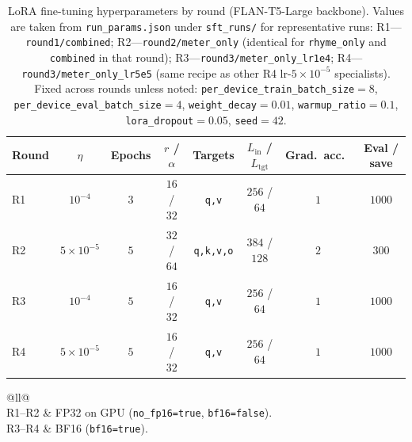 \begin{table}[t]
  \centering
  \small
  \caption{LoRA fine-tuning hyperparameters by round (FLAN-T5-Large backbone).
    Values are taken from \texttt{run\_params.json} under \texttt{sft\_runs/} for representative runs:
    R1---\texttt{round1/combined};
    R2---\texttt{round2/meter\_only} (identical for \texttt{rhyme\_only} and \texttt{combined} in that round);
    R3---\texttt{round3/meter\_only\_lr1e4};
    R4---\texttt{round3/meter\_only\_lr5e5} (same recipe as other R4 lr-$5{\times}10^{-5}$ specialists).
    Fixed across rounds unless noted: \texttt{per\_device\_train\_batch\_size}${}=8$, \texttt{per\_device\_eval\_batch\_size}${}=4$,
    \texttt{weight\_decay}${}=0.01$, \texttt{warmup\_ratio}${}=0.1$, \texttt{lora\_dropout}${}=0.05$, \texttt{seed}${}=42$.}
  \label{tab:lora-hyperparams-rounds}
  \begin{tabular}{@{}lccccccc@{}}
    \toprule
    Round
      & $\eta$
      & Epochs
      & $r$ / $\alpha$
      & Targets
      & $L_{\mathrm{in}}$ / $L_{\mathrm{tgt}}$
      & Grad.\ acc.\
      & Eval / save \\
    \midrule
    R1
      & $10^{-4}$
      & $3$
      & $16$ / $32$
      & \texttt{q,v}
      & $256$ / $64$
      & $1$
      & $1000$ \\
    R2
      & $5 \times 10^{-5}$
      & $5$
      & $32$ / $64$
      & \texttt{q,k,v,o}
      & $384$ / $128$
      & $2$
      & $300$ \\
    R3
      & $10^{-4}$
      & $5$
      & $16$ / $32$
      & \texttt{q,v}
      & $256$ / $64$
      & $1$
      & $1000$ \\
    R4
      & $5 \times 10^{-5}$
      & $5$
      & $16$ / $32$
      & \texttt{q,v}
      & $256$ / $64$
      & $1$
      & $1000$ \\
    \bottomrule
  \end{tabular}

  \vspace{0.5em}
  \begin{tabular}{@{}ll@{}}
     \\
    R1--R2 & FP32 on GPU (\texttt{no\_fp16=true}, \texttt{bf16=false}). \\
    R3--R4 & BF16 (\texttt{bf16=true}). \\
  \end{tabular}
\end{table}

